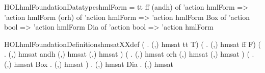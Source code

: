 \newcommand{\HOLhmlFoundationDate}{22 May 2012}
\newcommand{\HOLhmlFoundationTime}{10:31}
\begin{SaveVerbatim}{HOLhmlFoundationDatatypeshmlForm}
  = tt
  \HOLTokenBar{} ff
  \HOLTokenBar{} (andh) of 'action hmlForm => 'action hmlForm
  \HOLTokenBar{} (orh) of 'action hmlForm => 'action hmlForm
  \HOLTokenBar{} Box of 'action \HOLTokenMap{} bool => 'action hmlForm
  \HOLTokenBar{} Dia of 'action \HOLTokenMap{} bool => 'action hmlForm
\end{SaveVerbatim}
\newcommand{\HOLhmlFoundationDatatypeshmlForm}{\UseVerbatim{HOLhmlFoundationDatatypeshmlForm}}
\newcommand{\HOLhmlFoundationDatatypes}{
\HOLhmlFoundationDatatypeshmlForm}
\begin{SaveVerbatim}{HOLhmlFoundationDefinitionshmsatXXdef}
\HOLTokenTurnstile{} (\HOLTokenForall{} . (,) hmsat tt \HOLTokenEquiv{} T) \HOLTokenConj{}
   (\HOLTokenForall{} . (,) hmsat ff \HOLTokenEquiv{} F) \HOLTokenConj{}
   (\HOLTokenForall{}   .
      (,) hmsat  andh  \HOLTokenEquiv{}
      (,) hmsat  \HOLTokenConj{} (,) hmsat ) \HOLTokenConj{}
   (\HOLTokenForall{}   .
      (,) hmsat  orh  \HOLTokenEquiv{}
      (,) hmsat  \HOLTokenDisj{} (,) hmsat ) \HOLTokenConj{}
   (\HOLTokenForall{}   .
      (,) hmsat Box   \HOLTokenEquiv{}
      \HOLTokenForall{} .     \HOLTokenImp{}  \HOLTokenIn{}  \HOLTokenImp{} (,) hmsat ) \HOLTokenConj{}
   \HOLTokenForall{}   .
     (,) hmsat Dia   \HOLTokenEquiv{}
     \HOLTokenExists{} .     \HOLTokenConj{}  \HOLTokenIn{}  \HOLTokenConj{} (,) hmsat 
\end{SaveVerbatim}
\newcommand{\HOLhmlFoundationDefinitionshmsatXXdef}{\UseVerbatim{HOLhmlFoundationDefinitionshmsatXXdef}}
\newcommand{\HOLhmlFoundationDefinitions}{
\HOLDfnTag{hmlFoundation}{hmsat_def}\HOLhmlFoundationDefinitionshmsatXXdef
}
